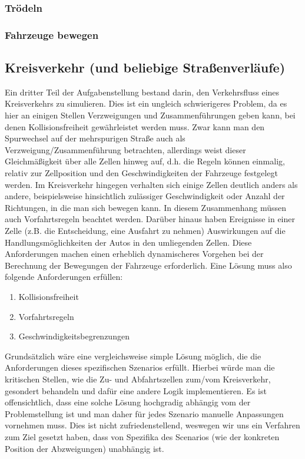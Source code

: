 \documentclass[11pt, a4paper]{article}
\begin{document}
\subsubsection{Trödeln}
\label{subsubsec:troedeln}

\subsubsection{Fahrzeuge bewegen}
\label{subsubsec:fahrzeugeBewegen}

\newpage

\subsection{Kreisverkehr (und beliebige Straßenverläufe)}
\label{subsec:umsetzung-kreisverkehr}

Ein dritter Teil der Aufgabenstellung bestand darin, den Verkehrsfluss eines Kreisverkehrs zu simulieren. Dies ist ein ungleich schwierigeres Problem, da es hier an einigen Stellen Verzweigungen und Zusammenführungen geben kann, bei denen Kollisionsfreiheit gewährleistet werden muss. Zwar kann man den Spurwechsel auf der mehrspurigen Straße auch als Verzweigung/Zusammenführung betrachten, allerdings weist dieser Gleichmäßigkeit über alle Zellen hinweg auf, d.h. die Regeln können einmalig, relativ zur Zellposition und den Geschwindigkeiten der Fahrzeuge festgelegt werden. Im Kreisverkehr hingegen verhalten sich einige Zellen deutlich anders als andere, beispielsweise hinsichtlich zulässiger Geschwindigkeit oder Anzahl der Richtungen, in die man sich bewegen kann. In diesem Zusammenhang müssen auch Vorfahrtsregeln beachtet werden. Darüber hinaus haben Ereignisse in einer Zelle (z.B. die Entscheidung, eine Ausfahrt zu nehmen) Auswirkungen auf die Handlungsmöglichkeiten der Autos in den umliegenden Zellen. Diese Anforderungen machen einen erheblich dynamischeres Vorgehen bei der Berechnung der Bewegungen der Fahrzeuge erforderlich. Eine Lösung muss also folgende Anforderungen erfüllen:

\begin{enumerate}
	\item Kollisionsfreiheit
	\item Vorfahrtsregeln
	\item Geschwindigkeitsbegrenzungen
\end{enumerate}

Grundsätzlich wäre eine vergleichsweise simple Lösung möglich, die die Anforderungen dieses spezifischen Szenarios erfüllt. Hierbei würde man die kritischen Stellen, wie die Zu- und Abfahrtszellen zum/vom Kreisverkehr, gesondert behandeln und dafür eine andere Logik implementieren. Es ist offensichtlich, dass eine solche Lösung hochgradig abhängig vom der Problemstellung ist und man daher für jedes Szenario manuelle Anpassungen vornehmen muss. Dies ist nicht zufriedenstellend, weswegen wir uns ein Verfahren zum Ziel gesetzt haben, dass von Spezifika des Scenarios (wie der konkreten Position der Abzweigungen) unabhängig ist.
\end{document}

